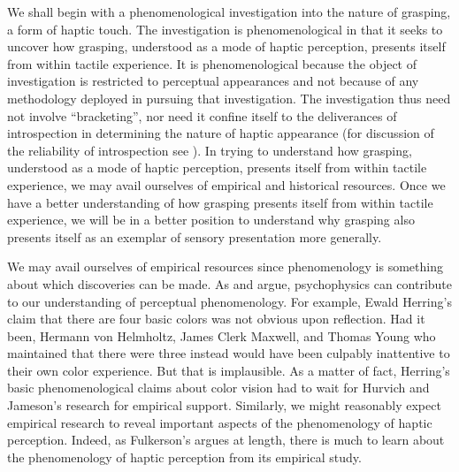 We shall begin with a phenomenological investigation into the nature of grasping, a form of haptic touch. The investigation is phenomenological in that it seeks to uncover how grasping, understood as a mode of haptic perception, presents itself from within tactile experience. It is phenomenological because the object of investigation is restricted to perceptual appearances and not because of any methodology deployed in pursuing that investigation. The investigation thus need not involve ``bracketing'', nor need it confine itself to the deliverances of introspection in determining the nature of haptic appearance (for discussion of the reliability of introspection see \citealt{Schwitzgebel:2008aa,Bayne:2010ca}). In trying to understand how grasping, understood as a mode of haptic perception, presents itself from within tactile experience, we may avail ourselves of empirical and historical resources. Once we have a better understanding of how grasping presents itself from within tactile experience, we will be in a better position to understand why grasping also presents itself as an exemplar of sensory presentation more generally. 

We may avail ourselves of empirical resources since phenomenology is something about which discoveries can be made. As \citet{Hilbert:2007qy} and \citet{Phillips:2012af} argue, psychophysics can contribute to our understanding of perceptual phenomenology. For example, Ewald Herring’s claim that there are four basic colors was not obvious upon reflection. Had it been, Hermann von Helmholtz, James Clerk Maxwell, and Thomas Young who maintained that there were three instead would have been culpably inattentive to their own color experience. But that is implausible. As a matter of fact, Herring’s basic phenomenological claims about color vision had to wait for Hurvich and Jameson’s research for empirical support. Similarly, we might reasonably expect empirical research to reveal important aspects of the phenomenology of haptic perception. Indeed, as Fulkerson's \citeyearpar{Fulkerson:2014ek} argues at length, there is much to learn about the phenomenology of haptic perception from its empirical study.

